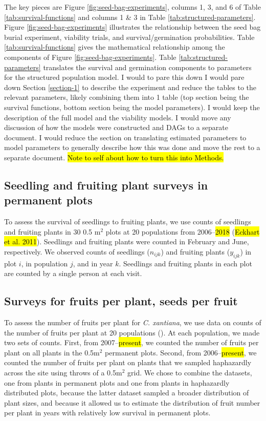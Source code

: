 \documentclass[12pt, oneside, titlepage]{article}   	%
\begin{document}
The key pieces are Figure \ref{fig:seed-bag-experiments}, columns 1, 3, and 6 of Table \ref{tab:survival-functions} and columns 1 \& 3 in Table \ref{tab:structured-parameters}. Figure \ref{fig:seed-bag-experiments} illustrates the relationship between the seed bag burial experiment, viability trials, and survival/germination probabilities. Table \ref{tab:survival-functions} gives the mathematical relationship among the components of Figure \ref{fig:seed-bag-experiments}. Table \ref{tab:structured-parameters} translates the survival and germination components to parameters for the structured population model. I would to pare this down I would pare down Section \ref{section-1} to describe the experiment and reduce the tables to the relevant parameters, likely combining them into 1 table (top section being the survival functions, bottom section being the model parameters). I would keep the description of the full model and the viability models. I would move any discussion of how the models were constructed and DAGs to a separate document. I would reduce the section on translating estimated parameters to model parameters to generally describe how this was done and move the rest to a separate document. \hl{Note to self about how to turn this into Methods.} 

\subsection{Seedling and fruiting plant surveys in permanent plots}

To assess the survival of seedlings to fruiting plants, we use counts of seedlings and fruiting plants in 30 0.5 m$^2$ plots at 20 populations from 2006--\hl{2018} (\hl{Eckhart et al. 2011}). Seedlings and fruiting plants were counted in February and June, respectively. We observed counts of seedlings ($n_{ijk}$) and fruiting plants ($y_{ijk}$) in plot $i$, in population $j$, and in year $k$. Seedlings and fruiting plants in each plot are counted by a single person at each visit. 

\subsection{Surveys for fruits per plant, seeds per fruit}

To assess the number of fruits per plant for \textit{C. xantiana}, we use data on counts of the number of fruits per plant at 20 populations (\cite{eckhart2011}). At each population, we made two sets of counts. First, from 2007--\hl{present}, we counted the number of fruits per plant on all plants in the 0.5m$^2$ permanent plots. Second, from 2006--\hl{present}, we counted the number of fruits per plant on plants that we sampled haphazardly across the site using throws of a 0.5m$^2$ grid. We chose to combine the datasets, one from plants in permanent plots and one from plants in haphazardly distributed plots, because the latter dataset sampled a broader distribution of plant sizes, and because it allowed us to estimate the distribution of fruit number per plant in years with relatively low survival in permanent plots. 
\end{document}

